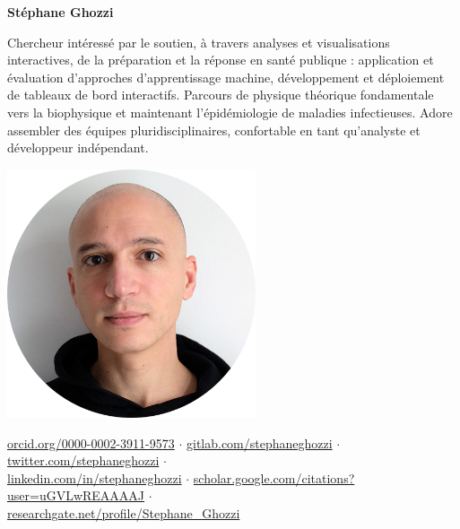 \documentclass[a4paper,11pt,oneside]{article}
\begin{document}

\noindent\begin{minipage}{0.7\linewidth}
   \LARGE
   \noindent\textbf{Stéphane Ghozzi}

   \normalsize
   \vspace{1.5em}
   \noindent Chercheur intéressé par le soutien, à travers analyses et visualisations interactives, de la préparation et la réponse en santé publique : application et évaluation d'approches d'apprentissage machine, développement et déploiement de tableaux de bord interactifs. Parcours de physique théorique fondamentale vers la biophysique et maintenant l'épidémiologie de maladies infectieuses. Adore assembler des équipes pluridisciplinaires, confortable en tant qu'analyste et développeur indépendant.
\end{minipage}
\begin{minipage}{0.3\linewidth}
   \begin{center}
      \includegraphics[width=0.55\textwidth,right]{GHOZZI-Stephane-portrait-2020-cropped-circle-nobackground-lr.png}
   \end{center}
\end{minipage} 

\vspace{1em}

\href{https://orcid.org/0000-0002-3911-9573}{orcid.org/0000-0002-3911-9573} $\cdot$ \href{https://gitlab.com/stephaneghozzi}{gitlab.com/stephaneghozzi} $\cdot$
\href{https://twitter.com/stephaneghozzi}{twitter.com/stephaneghozzi} $\cdot$\\ \href{https://www.linkedin.com/in/stephaneghozzi}{linkedin.com/in/stephaneghozzi} $\cdot$ \href{https://scholar.google.com/citations?user=uGVLwREAAAAJ}{scholar.google.com/citations?user=uGVLwREAAAAJ} $\cdot$ \\
\href{https://www.researchgate.net/profile/Stephane\_Ghozzi}{researchgate.net/profile/Stephane\_Ghozzi}
\end{document}
